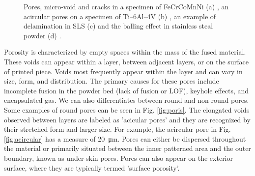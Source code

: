 \begin{figure}
{    }
    \qquad
    \qquad
    \caption[Defect examples in PBF.]{Pores, micro-void and cracks in a specimen of FeCrCoMnNi (a) \cite{mostafaei_defects_2022}, an acircular pores on a specimen of Ti–6Al–4V (b) \cite{tammas-williams_xct_2015}, an example of delamination in SLS (c) \cite{sames_metallurgy_2016} and the balling effect in stainless steal powder (d) \cite{li_balling_2012}.}
\end{figure} 
Porosity is characterized by empty spaces within the mass of the fused material. These voids can appear within a layer, between adjacent layers, or on the surface of printed piece. Voids most frequently appear within the layer and can vary in size, form, and distribution. The primary causes for these pores include incomplete fusion in the powder bed (lack of fusion or LOF), keyhole effects, and encapsulated gas. We can also differentiates between round and non-round pores. Some examples of round pores can be seen in Fig. \ref{fig:poris}. The elongated voids observed between layers are labeled as 'acicular pores' and they are recognized by their stretched form and larger size. For example, the acircular pore in Fig. \ref{fig:acircular} has a measure of \SI{20}{\micro\metre}. Pores can either be dispersed throughout the material or primarily situated between the inner patterned area and the outer boundary, known as under-skin pores. Pores can also appear on the exterior surface, where they are typically termed 'surface porosity'.

